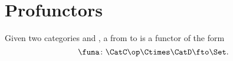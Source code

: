

\section{Profunctors}

\begin{ctdefinition}[Profunctor]
  \label{def:profunctor}
  Given two categories \CatC and \CatD, a \emph{} from \CatC to \CatD is a functor of the form
  \begin{equation}
    \funa\colon \CatC\op \Ctimes \CatD \fto \Set.
  \end{equation}
\end{ctdefinition}



\begin{exercise}
\end{exercise}
\begin{solution}
\end{solution}
